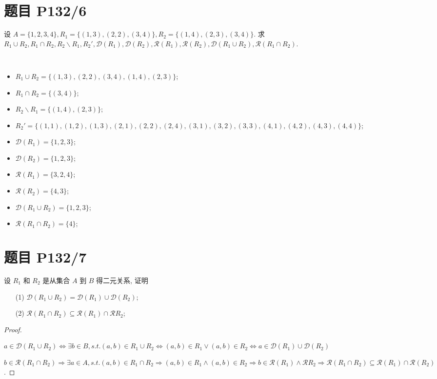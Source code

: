 \section{题目 P132/6}

设 $A=\{1,2,3,4\},R_1=\{(1,3),(2,2),(3,4)\},R_2=\{(1,4),(2,3),(3,4)\}$. 求 $R_1\cup R_2,R_1\cap R_2,R_2\backslash R_1,R_2',\mathscr{D}(R_1),\mathscr{D}(R_2),\mathscr{R}(R_1),\mathscr{R}(R_2),\mathscr{D}(R_1\cup R_2),\mathscr{R}(R_1\cap R_2)$.

\begin{solution}\
	
	\begin{itemize}
		\item $R_1\cup R_2=\{(1,3),(2,2),(3,4),(1,4),(2,3)\}$;
		\item $R_1\cap R_2=\{(3,4)\}$;
		\item $R_2\backslash R_1=\{(1,4),(2,3)\}$;
		\item $R_2'=\{(1,1),(1,2),(1,3),(2,1),(2,2),(2,4),(3,1),(3,2),(3,3),(4,1),(4,2),(4,3),(4,4)\}$;
		\item $\mathscr{D}(R_1)=\{1,2,3\}$;
		\item $\mathscr{D}(R_2)=\{1,2,3\}$;
		\item $\mathscr{R}(R_1)=\{3,2,4\}$;
		\item $\mathscr{R}(R_2)=\{4,3\}$;
		\item $\mathscr{D}(R_1\cup R_2)=\{1,2,3\}$;
		\item $\mathscr{R}(R_1\cap R_2)=\{4\}$;
	\end{itemize}
\end{solution}

\section{题目 P132/7}

设 $R_1$ 和 $R_2$ 是从集合 $A$ 到 $B$ 得二元关系, 证明
\begin{itemize}[leftmargin=1.5cm]
	\item[(1)] $\mathscr{D}(R_1\cup R_2)=\mathscr{D}(R_1)\cup\mathscr{D}(R_2)$;
	\item[(2)] $\mathscr{R}(R_1 \cap R_2)\subseteq \mathscr{R}(R_1)\cap \mathscr{R}{R_2}$;
\end{itemize}

\begin{proof}\
	
	$a\in \mathscr{D}(R_1 \cup R_2) \Leftrightarrow \exists b \in B,s.t. (a,b) \in R_1\cup R_2\Leftrightarrow (a,b)\in R_1 \vee (a,b)\in R_2 \Leftrightarrow a\in\mathscr{D}(R_1)\cup\mathscr{D}(R_2)$
	
	$b\in \mathscr{R}(R_1\cap R_2) \Rightarrow \exists a\in A,s.t.(a,b) \in R_1\cap R_2 \Rightarrow (a,b) \in R_1 \wedge (a,b) \in R_2 \Rightarrow b \in \mathscr{R}(R_1)\wedge \mathscr{R}{R_2}\Rightarrow  \mathscr{R}(R_1 \cap R_2)\subseteq \mathscr{R}(R_1) \cap \mathscr{R}(R_2)$.
\end{proof}

